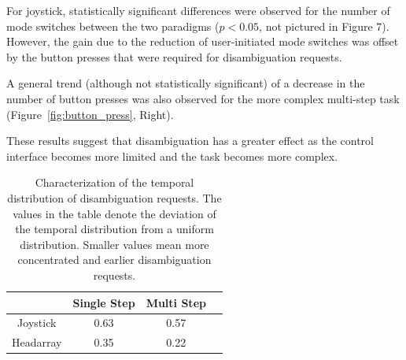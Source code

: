 For joystick, statistically significant differences were observed for the number of mode switches between the two paradigms ($p < 0.05$, not pictured in Figure 7). However, the gain due to the reduction of user-initiated mode switches was offset by the button presses that were required for disambiguation requests. 

A general trend (although not statistically significant) of a decrease in the number of button presses was also observed for the more complex multi-step task (Figure~\ref{fig:button_press}, Right). 

These results suggest that disambiguation has a greater effect as the control interface becomes more limited and the task becomes more complex.
\begin{table}[t]
	\centering
	\begin{tabular}{|c|c|c|c|}
		\hline
		& Single Step & Multi Step \\
		\hline
		Joystick & 0.63 & 0.57 \\
		\hline
		Headarray & 0.35 & 0.22 \\
		\hline
	\end{tabular}
	\vspace{.2cm}
	\caption{Characterization of the temporal distribution of disambiguation requests. The values in the table denote the deviation of the temporal distribution from a uniform distribution. Smaller values mean more concentrated and earlier disambiguation requests. } 
	\label{table:skewness}
	\vspace{-.5cm}
\end{table}
